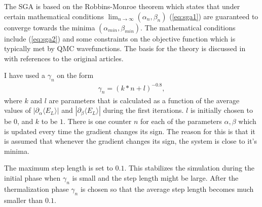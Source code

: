 \documentclass[a4paper,10pt,twocolumn]{article} %
\newcommand{\expec}[1]{\langle{}{#1}\rangle{}}
\begin{document}
The SGA is based on the Robbins-Monroe theorem which states that under certain mathematical conditions $\lim_{n\to\infty}(\alpha_n,\beta_n)$ (\ref{eq:sga1})
are guaranteed to converge towards the minima $(\alpha_{min},\beta_{min})$. The mathematical conditions include (\ref{eq:sga2}) and some constraints on the
objective function which is typically met by QMC wavefunctions.
The basis for the theory is discussed in \cite{nissenbaum_2008} with references to the original articles. 

I have used a $\gamma_n$ on the form
\begin{align}
	\gamma_n=(k * n + l )^{-0.8},
\end{align}
where $k$ and $l$ are parameters that is calculated as a function of the average values of $|\partial_\alpha\expec{E_L}|$ and $|\partial_\beta\expec{E_L}|$ during the first iterations.
$l$ is initially chosen to be $0$, and $k$ to be $1$.
There is one counter $n$ for each of the parameters $\alpha,\beta$ which is updated every time the gradient changes its sign. The reason for this is that it 
is assumed that whenever the gradient changes its sign, the system is close to it's minima\cite{harju_2005}. 

The maximum step length is set to $0.1$. This stabilizes the simulation during the initial phase when $\gamma_n$ is small and the step length might be large.
After the thermalization phase $\gamma_n$ is chosen so that the average step length becomes much smaller than $0.1$.
\end{document}
